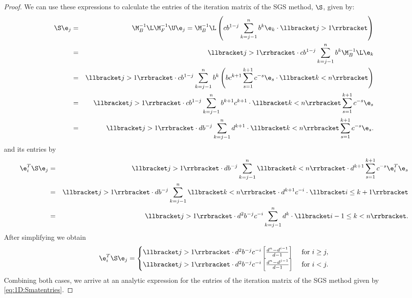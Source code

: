 \begin{proof}
We can use these expressions to calculate the entries of the iteration matrix
of the SGS method, $\S$, given by:
\begin{eqnarray*}
\S\e_j&=&\M_B^{-1}\L\M_F^{-1}\U\e_j=\M_B^{-1}\L\left(cb^{1-j}\sum_{k=j-1}^{n}b^{k}\e_{k} \cdot \llbracket j>1\rrbracket\right)\\
&=&\llbracket j>1\rrbracket \cdot cb^{1-j}\sum_{k=j-1}^nb^k\M_B^{-1}\L\e_k\\
&=&\llbracket j>1\rrbracket \cdot cb^{1-j}\sum_{k=j-1}^nb^k
\left( bc^{k+1}\sum_{s=1}^{k+1}c^{-s}\e_s\cdot  \llbracket k<n \rrbracket
\right)\\
&=& \llbracket j>1\rrbracket \cdot cb^{1-j}\sum_{k=j-1}^nb^{k+1}c^{k+1}\cdot
\llbracket k<n \rrbracket \sum_{s=1}^{k+1}c^{-s}\e_s\\
&=& \llbracket j>1\rrbracket\cdot db^{-j}\sum_{k=j-1}^nd^{k+1}\cdot\llbracket
k<n \rrbracket \sum_{s=1}^{k+1}c^{-s}\e_s.
\end{eqnarray*}
and its entries by
%
\begin{eqnarray*}
\e_i^T\S\e_j
&=&\llbracket j>1\rrbracket \cdot db^{-j}\sum_{k=j-1}^n \llbracket
k<n\rrbracket \cdot d^{k+1}\sum_{s=1}^{k+1}c^{-s}\e_i^T\e_s\\
&=&\llbracket j>1\rrbracket \cdot db^{-j}\sum_{k=j-1}^n \llbracket
k<n\rrbracket \cdot d^{k+1}c^{-i}\cdot\llbracket i \leq  k+1\rrbracket \\
&=&\llbracket j>1\rrbracket \cdot d^2b^{-j}c^{-i}\sum_{k=j-1}^n d^{k}\cdot
\llbracket i-1 \leq  k < n\rrbracket .
\end{eqnarray*}
After simplifying we obtain
\begin{eqnarray*}
\e_i^T\S\e_j=
\begin{cases}
\llbracket j>1 \rrbracket \cdot d^2b^{-j}c^{-i}\left[ \frac{d^{n}-d^{i-1}}{d-1}
\right] &\mbox{ for } i\geq j, \\
\llbracket j>1 \rrbracket \cdot d^2b^{-j}c^{-i}\left[\frac{d^{n}-d^{j-1}}{d-1}
\right] &\mbox{ for } i<j.
\end{cases}
\end{eqnarray*}
Combining both cases, we arrive at an analytic expression for the entries of
the iteration matrix of the SGS method given by \eqref{eq:1D:Smatentries}.
\end{proof}
